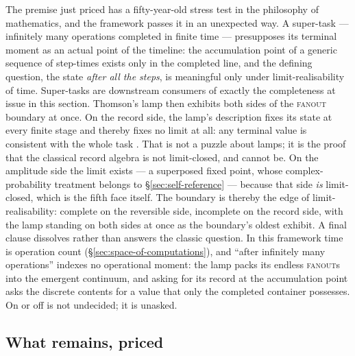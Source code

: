 The premise just priced has a fifty-year-old stress test in the philosophy of mathematics, and the
framework passes it in an unexpected way. A super-task --- infinitely many operations completed in
finite time \autocite{Thomson_1954} --- presupposes its terminal moment as an actual point of the
timeline: the accumulation point of a generic sequence of step-times exists only in the completed
line, and the defining question, the state \emph{after all the steps}, is meaningful only under
limit-realisability of time. Super-tasks are downstream consumers of exactly the completeness at
issue in this section. Thomson's lamp then exhibits both sides of the \textsc{fanout} boundary at
once. On the record side, the lamp's description fixes its state at every finite stage and thereby
fixes no limit at all: any terminal value is consistent with the whole task
\autocite{Thomson_1954,benacerraf1962tasks}. That is not a puzzle about lamps; it is the proof that
the classical record algebra is not limit-closed, and cannot be. On the amplitude side the limit
exists --- a superposed fixed point, whose complex-probability treatment belongs to
\S\ref{sec:self-reference} --- because that side \emph{is} limit-closed, which is the fifth face
itself. The boundary is thereby the edge of limit-realisability: complete on the reversible side,
incomplete on the record side, with the lamp standing on both sides at once as the boundary's oldest
exhibit. A final clause dissolves rather than answers the classic question. In this framework time
is operation count (\S\ref{sec:space-of-computations}), and ``after infinitely many operations''
indexes no operational moment: the lamp packs its endless \textsc{fanout}s into the emergent
continuum, and asking for its record at the accumulation point asks the discrete contents for a
value that only the completed container possesses. On or off is not undecided; it is unasked.

\subsection{What remains, priced}

